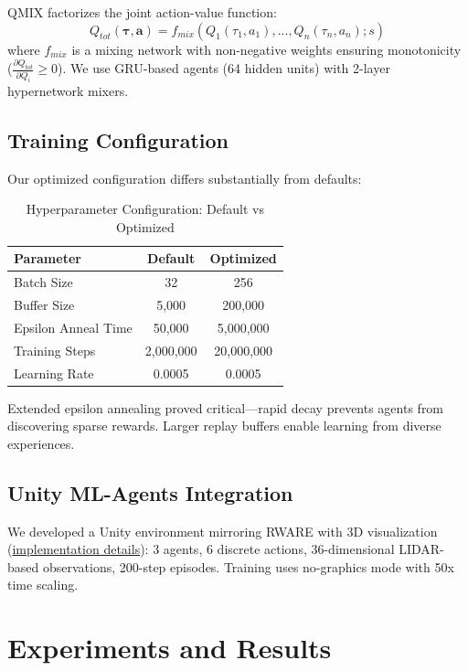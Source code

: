 \documentclass[11pt]{article}
\begin{document}
QMIX factorizes the joint action-value function:
\begin{equation}
Q_{tot}(\boldsymbol{\tau}, \boldsymbol{a}) = f_{mix}(Q_1(\tau_1, a_1), ..., Q_n(\tau_n, a_n); s)
\end{equation}
where $f_{mix}$ is a mixing network with non-negative weights ensuring monotonicity ($\frac{\partial Q_{tot}}{\partial Q_i} \geq 0$). We use GRU-based agents (64 hidden units) with 2-layer hypernetwork mixers.

\subsection{Training Configuration}

Our optimized configuration differs substantially from defaults:

\begin{table}[H]
\centering
\small
\caption{Hyperparameter Configuration: Default vs Optimized}
\begin{tabular}{lcc}
\toprule
Parameter & Default & Optimized \\
\midrule
Batch Size & 32 & 256 \\
Buffer Size & 5,000 & 200,000 \\
Epsilon Anneal Time & 50,000 & 5,000,000 \\
Training Steps & 2,000,000 & 20,000,000 \\
Learning Rate & 0.0005 & 0.0005 \\
\bottomrule
\end{tabular}
\end{table}

Extended epsilon annealing proved critical---rapid decay prevents agents from discovering sparse rewards. Larger replay buffers enable learning from diverse experiences.

\subsection{Unity ML-Agents Integration}

We developed a Unity environment mirroring RWARE with 3D visualization (\href{https://pallman14.github.io/MARL-QMIX-Warehouse-Robots/price/week3.html}{implementation details}): 3 agents, 6 discrete actions, 36-dimensional LIDAR-based observations, 200-step episodes. Training uses no-graphics mode with 50x time scaling.

\section{Experiments and Results}
\end{document}
